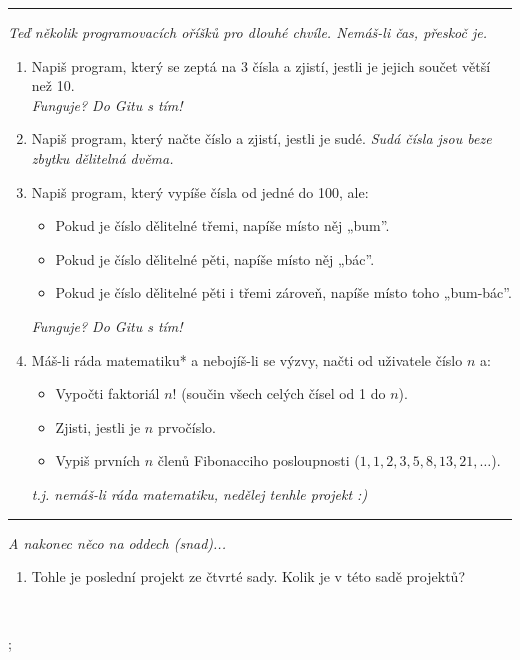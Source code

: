 \documentclass[a4paper,10pt]{article}
\newcommand\startsection[1]{
     \vspace{0.2ex}
    \hrule
    {\fontspec{Oxygen} \tiny
     \vspace{-1ex}
     \emph{#1}
     \vspace{-1.5em}
    }
}
\begin{document}
\startsection{Teď několik programovacích oříšků pro dlouhé chvíle. Nemáš-li čas, přeskoč je.}

\begin{enumerate}[resume]

\item Napiš program, který se zeptá na 3 čísla
    a zjistí, jestli je jejich součet větší než 10.
    \\\emph{\small Funguje? Do Gitu s tím!}

\item Napiš program, který načte číslo a zjistí, jestli je sudé.
    \emph{\small Sudá čísla jsou beze \emph{zbytku} dělitelná dvěma.}

\item Napiš program, který vypíše čísla od jedné do 100, ale:
    \begin{itemize}
        \item Pokud je číslo dělitelné třemi, napíše místo něj „bum”.
        \item Pokud je číslo dělitelné pěti, napíše místo něj „bác”.
        \item Pokud je číslo dělitelné pěti i třemi zároveň, napíše místo toho „bum-bác”.
    \end{itemize}
    \emph{\small Funguje? Do Gitu s tím!}

\item Máš-li ráda matematiku* a nebojíš-li se výzvy, načti od uživatele číslo $n$ a:
    \begin{itemize}
        \item Vypočti faktoriál $n!$ (součin všech celých čísel od 1 do $n$).
        \item Zjisti, jestli je $n$ prvočíslo.
        \item Vypiš prvních $n$ členů Fibonacciho posloupnosti ($1, 1, 2, 3, 5, 8, 13, 21, \ldots $).
    \end{itemize}
    \emph{\small * t.j. nemáš-li ráda matematiku, nedělej tenhle projekt :)}

\end{enumerate}

\startsection{A nakonec něco na oddech (snad)...}

\begin{enumerate}[resume]
\item Tohle je poslední projekt ze čtvrté sady. Kolik je v této sadě projektů?

\end{enumerate}

\vfill
\hfill~%
\begin{tikz}
;
\end{tikz}
\end{document}
